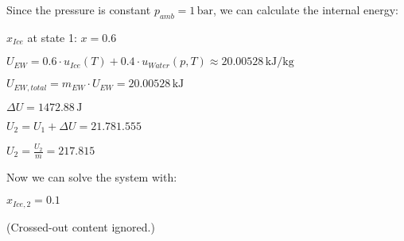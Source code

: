 Since the pressure is constant \( p_{amb} = 1 \, \text{bar} \), we can calculate the internal energy:  

\( x_{Ice} \) at state 1: \( x = 0.6 \)  

\( U_{EW} = 0.6 \cdot u_{Ice}(T) + 0.4 \cdot u_{Water}(p, T) \approx 20.00528 \, \text{kJ/kg} \)  

\( U_{EW,total} = m_{EW} \cdot U_{EW} = 20.00528 \, \text{kJ} \)  

\( \Delta U = 1472.88 \, \text{J} \)  

\( U_2 = U_1 + \Delta U = 21.781.555 \)  

\( U_2 = \frac{U_2}{m} = 217.815 \)  

Now we can solve the system with:  

\( x_{Ice,2} = 0.1 \)  

(Crossed-out content ignored.)
